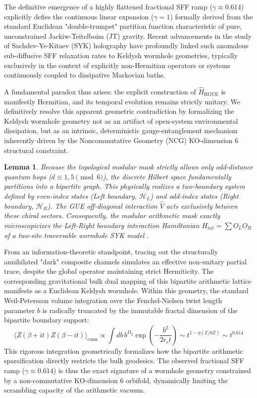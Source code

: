 \documentclass[aps,prl,preprint,superscriptaddress,floatfix]{revtex4-2}
\newtheorem{lemma}[theorem]{Lemma}
\newcommand{\Hilb}{\mathcal{H}}
\newcommand{\Zmod}{\mathbb{Z}/6\mathbb{Z}}
\begin{document}
The definitive emergence of a highly flattened fractional SFF ramp ($\gamma \approx 0.614$) explicitly defies the continuous linear expansion ($\gamma = 1$) formally derived from the standard Euclidean "double-trumpet" partition function characteristic of pure, unconstrained Jackiw-Teitelboim (JT) gravity. Recent advancements in the study of Sachdev-Ye-Kitaev (SYK) holography have profoundly linked such anomalous sub-diffusive SFF relaxation rates to Keldysh wormhole geometries, typically exclusively in the context of explicitly non-Hermitian operators or systems continuously coupled to dissipative Markovian baths. 

A fundamental paradox thus arises: the explicit construction of $\hat{H}_{\text{RGUE}}$ is manifestly Hermitian, and its temporal evolution remains strictly unitary. We definitively resolve this apparent geometric contradiction by formalizing the Keldysh wormhole geometry not as an artifact of open-system environmental dissipation, but as an intrinsic, deterministic gauge-entanglement mechanism inherently driven by the Noncommutative Geometry (NCG) KO-dimension 6 structural constraint.

\begin{lemma}
\label{lemma:keldysh_hermitian_entanglement}
Because the topological modular mask strictly allows only odd-distance quantum hops ($d \equiv 1, 5 \pmod 6$), the discrete Hilbert space fundamentally partitions into a bipartite graph. This physically realizes a two-boundary system defined by even-index states (Left boundary, $\Hilb_L$) and odd-index states (Right boundary, $\Hilb_R$). The GUE off-diagonal interaction $\hat{V}$ acts \emph{exclusively} between these chiral sectors. Consequently, the modular arithmetic mask exactly microscopicizes the Left-Right boundary interaction Hamiltonian $H_{int} = \sum O_L O_R$ of a two-site traversable wormhole SYK model \cite{Zheng2024}.
\end{lemma}

From an information-theoretic standpoint, tracing out the structurally annihilated "dark" composite channels simulates an effective non-unitary partial trace, despite the global operator maintaining strict Hermiticity. The corresponding gravitational bulk dual mapping of this bipartite arithmetic lattice manifests as a Euclidean Keldysh wormhole. Within this geometry, the standard Weil-Petersson volume integration over the Fenchel-Nielsen twist length parameter $b$ is radically truncated by the immutable fractal dimension of the bipartite boundary support:
\begin{equation}
\langle Z(\beta + it) Z(\beta - it) \rangle_{\text{conn}} \propto \int db \, b^{D_2} \exp\left(-\frac{b^2}{2 \epsilon_c t}\right) \sim t^{1 - \eta(\Zmod)} \sim t^{0.614}
\end{equation}
This rigorous integration geometrically formalizes how the bipartite arithmetic sparsification directly restricts the bulk geodesics. The observed fractional SFF ramp ($\gamma \approx 0.614$) is thus the exact signature of a wormhole geometry constrained by a non-commutative KO-dimension 6 orbifold, dynamically limiting the scrambling capacity of the arithmetic vacuum.
\end{document}

